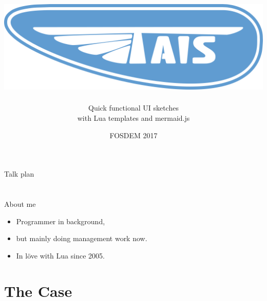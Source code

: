 \documentclass[aspectratio=43,handout,bigger]{beamer}
\title{\includegraphics[height=.15\textheight]{logo}}
\author{Quick functional UI sketches\\with Lua templates and mermaid.js}
\institute{Alexander Gladysh\\@agladysh}
\date{FOSDEM 2017}
\begin{document}
\begin{frame}[plain]
 \titlepage
\end{frame}


\begin{frame}{Talk plan}

\tableofcontents

\end{frame}


\section*{}

\begin{frame}{About me}

\begin{itemize}
\item Programmer in background,
\item but mainly doing management work now.
\item In löve with Lua since 2005.
\end{itemize}

\end{frame}


\section{The Case}

\end{document}
